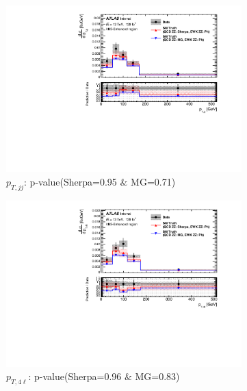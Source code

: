 \begin{figure}[!htb]
\begin{subfigure}{.48\textwidth}
        \centering
        \includegraphics[width=.98\linewidth]{figures/Results/CrossSection_VBSEnhanced/xs_ptjj_SR.pdf}
        \caption{ \footnotesize{$p_{T,jj}$: p-value(Sherpa=0.95 $\&$ MG=0.71)}}
    \end{subfigure}
    \begin{subfigure}{.48\textwidth}
        \centering
        \includegraphics[width=.98\linewidth]{figures/Results/CrossSection_VBSEnhanced/xs_pt4l_SR.pdf}
        \caption{ \footnotesize{$p_{T,4\ell}$: p-value(Sherpa=0.96 $\&$ MG=0.83)}}
    \end{subfigure}\\
    \begin{subfigure}{.48\textwidth}
        \centering

\end{subfigure}
\end{figure}
